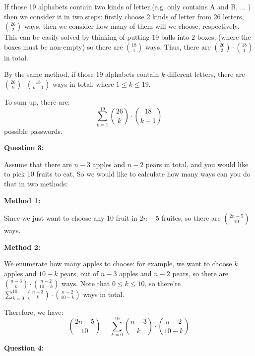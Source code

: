 \documentclass[a4paper,11pt]{article}
\begin{document}
\begin{spacing}{1.4}
    \hspace{2em}
    If those 19 alphabets contain two kinds of letter,(e.g. only contains
    A and B, ... ) then we consider it in two steps: firstly choose 2 kinds
    of letter from 26 letters, ${26\choose 2}$ ways, then we consider
    how many of them will we choose, respectively. 
    This can be easily solved by thinking of putting 19 balls into 2 boxes,
    (where the boxes must be non-empty) so there are ${18\choose 1}$ ways.
    Thus, there are ${26\choose 2}\cdot {18\choose 1}$ in total.

    \hspace{2em}
    By the same method, if those 19 alphabets contain $k$ different letters,
    there are ${26\choose k}\cdot {18\choose k-1}$ ways in total, where
    $1\le k\le 19$.

    \hspace{2em}
    To sum up, there are:
    $$\sum_{k=1}^{19}{26\choose k}\cdot {18\choose k-1}$$
    possible passwords.


    \vspace{20pt}


    \textbf{Question 3:}

    \hspace{2em}
    Assume that there are $n-3$ apples and $n-2$ pears in total,
    and you would like to pick 10 fruits to eat. So we would like
    to calculate how many ways can you do that in two methods:
 
    \textbf{Method 1:} 
    
    \hspace{2em}
    Since we just want to choose any 10 fruit in 
    $2n-5$ fruites, so there are ${2n-5\choose 10}$ ways.

    \textbf{Method 2:} 
    
    \hspace{2em}
    We enumerate how many apples to choose: 
    for example, we want to choose $k$ apples and $10-k$ pears, out of
    $n-3$ apples and $n-2$ pears, so there are 
    ${n-3\choose k}\cdot {n-2\choose 10-k}$ ways.
    Note that $0\le k \le 10$, so there're 
    $\sum_{k=0}^{10}{n-3\choose k}\cdot {n-2\choose 10-k}$ ways in total.

    Therefore, we have:
    $${2n-5\choose 10}=\sum_{k=0}^{10}{n-3\choose k}\cdot {n-2\choose 10-k}$$


    \vspace{20pt}

    \textbf{Question 4:}


\end{spacing}
\end{document}
